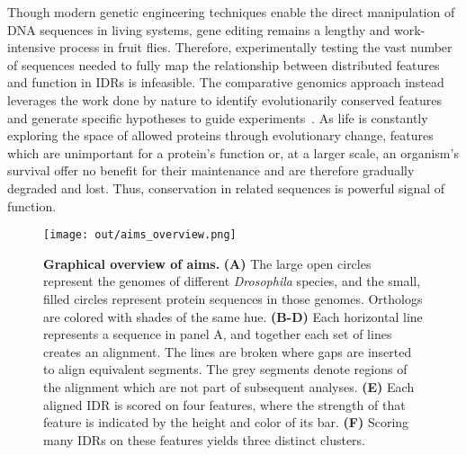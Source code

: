 Though modern genetic engineering techniques enable the direct manipulation of DNA sequences in living systems, gene editing remains a lengthy and work-intensive process in fruit flies. Therefore, experimentally testing the vast number of sequences needed to fully map the relationship between distributed features and function in IDRs is infeasible. The comparative genomics approach instead leverages the work done by nature to identify evolutionarily conserved features and generate specific hypotheses to guide experiments~\cite{Hardison2003}. As life is constantly exploring the space of allowed proteins through evolutionary change, features which are unimportant for a protein's function or, at a larger scale, an organism's survival offer no benefit for their maintenance and are therefore gradually degraded and lost. Thus, conservation in related sequences is powerful signal of function.

\begin{figure}[h!]
\texttt{[image: out/aims\_overview.png]}
\centering
\caption{\textbf{Graphical overview of aims.}
\textbf{(A)} The large open circles represent the genomes of different \textit{Drosophila} species, and the small, filled circles represent protein sequences in those genomes. Orthologs are colored with shades of the same hue. \textbf{(B-D)} Each horizontal line represents a sequence in panel A, and together each set of lines creates an alignment. The lines are broken where gaps are inserted to align equivalent segments. The grey segments denote regions of the alignment which are not part of subsequent analyses. \textbf{(E)} Each aligned IDR is scored on four features, where the strength of that feature is indicated by the height and color of its bar. \textbf{(F)} Scoring many IDRs on these features yields three distinct clusters.}
\label{fig:aims_overview}
\end{figure}

